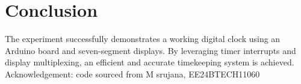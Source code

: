 \documentclass[12pt,a4paper]{article}
\begin{document}
\section{Conclusion}
The experiment successfully demonstrates a working digital clock using an Arduino board and seven-segment displays. By leveraging timer interrupts and display multiplexing, an efficient and accurate timekeeping system is achieved.\\

Acknowledgement: code sourced from M srujana, EE24BTECH11060
\end{document}
